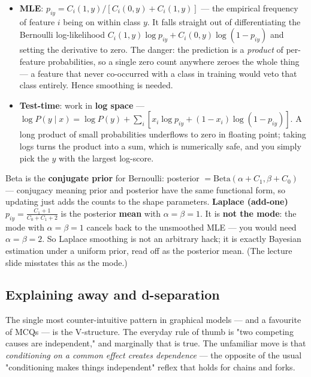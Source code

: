 \documentclass[11pt, a4paper]{article}
\newcommand{\kw}[1]{\textbf{#1}}
\begin{document}
\begin{itemize}
  \item \kw{MLE}: $p_{iy}=C_i(1,y)/[C_i(0,y)+C_i(1,y)]$ — the empirical frequency of feature $i$
  being on within class $y$. It falls straight out of differentiating the Bernoulli log-likelihood
  $C_i(1,y)\log p_{iy}+C_i(0,y)\log(1-p_{iy})$ and setting the derivative to zero. The danger: the
  prediction is a \emph{product} of per-feature probabilities, so a single zero count anywhere
  zeroes the whole thing — a feature that never co-occurred with a class in training would veto that
  class entirely. Hence smoothing is needed.
  \item \kw{Test-time}: work in \kw{log space} —
  $\log P(y\mid x)=\log P(y)+\sum_i[x_i\log p_{iy}+(1-x_i)\log(1-p_{iy})]$. A long product of small
  probabilities underflows to zero in floating point; taking logs turns the product into a sum,
  which is numerically safe, and you simply pick the $y$ with the largest log-score.
\end{itemize}

\begin{trapbox}[Laplace smoothing = posterior \emph{mean} of a uniform Beta prior]
Beta is the \kw{conjugate prior} for Bernoulli: posterior $=\text{Beta}(\alpha+C_1,\beta+C_0)$ —
conjugacy meaning prior and posterior have the same functional form, so updating just adds the
counts to the shape parameters.
\kw{Laplace (add-one)} $p_{iy}=\frac{C_1+1}{C_0+C_1+2}$ is the posterior \kw{mean} with
$\alpha=\beta=1$. It is \kw{not the mode}: the mode with $\alpha=\beta=1$ cancels back to the
unsmoothed MLE — you would need $\alpha=\beta=2$. So Laplace smoothing is not an arbitrary hack; it
is exactly Bayesian estimation under a uniform prior, read off as the posterior mean. (The lecture
slide misstates this as the mode.)
\end{trapbox}

\subsection{Explaining away and d-separation}

The single most counter-intuitive pattern in graphical models — and a favourite of MCQs — is the
V-structure. The everyday rule of thumb is "two competing causes are independent," and marginally
that is true. The unfamiliar move is that \emph{conditioning on a common effect creates dependence}
— the opposite of the usual "conditioning makes things independent" reflex that holds for chains and
forks.
\end{document}
